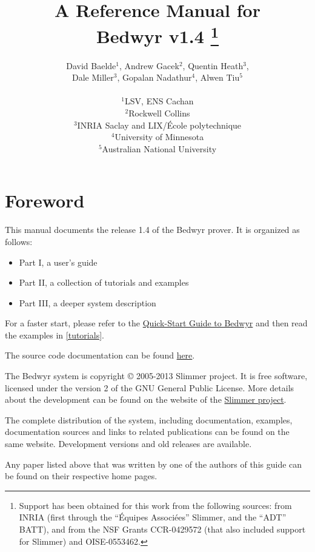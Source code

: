 \documentclass[a4paper]{article} %
\title{{\Huge A Reference Manual for\\Bedwyr v1.4}
   \thanks{Support has been obtained for this work from the following
           sources: from INRIA (first through the ``\'Equipes
           Associ{\'e}es'' Slimmer, and the ``ADT'' BATT),
           and from the NSF Grants CCR-0429572 (that also included
           support for Slimmer) and OISE-0553462.}
}
\author{David Baelde$^1$,
        Andrew Gacek$^2$,
        Quentin Heath$^3$,\\
        Dale Miller$^3$,
        Gopalan Nadathur$^4$,
        Alwen Tiu$^5$\\\\
        $^1$LSV, ENS Cachan\\
        $^2$Rockwell Collins\\
        $^3$INRIA Saclay and LIX/\'Ecole polytechnique\\
        $^4$University of Minnesota\\
        $^5$Australian National University}
\begin{document}
\maketitle
\tableofcontents
\newpage


\section*{Foreword}

This manual documents the release 1.4 of the Bedwyr prover.  It is
organized as follows:
\begin{itemize}
  \item Part I, a user's guide
  \item Part II, a collection of tutorials and examples
  \item Part III, a deeper system description
\end{itemize}

For a faster start, please refer to the
\href{http://slimmer.gforge.inria.fr/bedwyr/doc/quickstart.html}
  {Quick-Start Guide to Bedwyr}
and then read the examples in \autoref{tutorials}.

The source code documentation can be found
\href{http://slimmer.gforge.inria.fr/bedwyr/doc/libref/}{here}.

The Bedwyr system is copyright \copyright{} 2005-2013 Slimmer project.
It is free software, licensed under the version 2 of the GNU General
Public License.  More details about the development can be found on the
website of the \href{http://slimmer.gforge.inria.fr/}{Slimmer project}.

The complete distribution of the system, including documentation,
examples, documentation sources and links to related publications can be
found on the same website.  Development versions and old releases are
available.

\lstlistoflistings
\listoffigures







\appendix



\noindent Any paper listed above that was written by one of the authors
of this guide can be found on their respective home pages.
\end{document}

